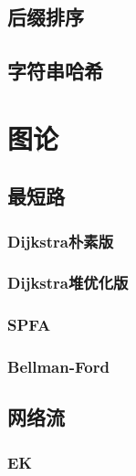 \documentclass[10pt,a4paper]{article}
\begin{document}
\subsection{后缀排序}
\begin{spacing}{1.5}

\end{spacing}

\subsection{字符串哈希}

\section{图论}
\subsection{最短路}
\subsubsection{Dijkstra朴素版}
\begin{spacing}{1.5}

\end{spacing}

\subsubsection{Dijkstra堆优化版}
\begin{spacing}{1.5}

\end{spacing}

\subsubsection{SPFA}
\begin{spacing}{1.5}

\end{spacing}

\subsubsection{Bellman-Ford}

\subsection{网络流}
\subsubsection{EK}

\end{document}
